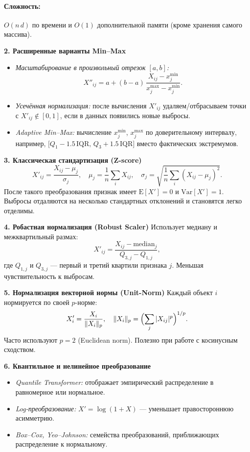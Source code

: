\paragraph{Сложность:} \(O(n\,d)\) по времени и \(O(1)\) дополнительной памяти (кроме хранения самого массива).

\medskip
\noindent\textbf{2. Расширенные варианты Min–Max}  
\begin{itemize}
  \item \emph{Масштабирование в произвольный отрезок \([a,b]\):}
    \[
      X''_{ij} = a + (b - a)\,\frac{X_{ij} - x_j^{\min}}{x_j^{\max} - x_j^{\min}}.
    \]
  \item \emph{Усечённая нормализация:} после вычисления \(X'_{ij}\) удаляем/отбрасываем точки с \(X'_{ij}\notin[0,1]\), если в данных появились новые выбросы.
  \item \emph{Adaptive Min–Max:} вычисление \(x_j^{\min}\), \(x_j^{\max}\) по доверительному интервалу, например, \(\bigl[Q_1 - 1.5\,\mathrm{IQR},\,Q_3 + 1.5\,\mathrm{IQR}\bigr]\) вместо фактических экстремумов.
\end{itemize}

\medskip
\noindent\textbf{3. Классическая стандартизация (Z-score)}  
\[
  X'_{ij} = \frac{X_{ij} - \mu_j}{\sigma_j},
  \quad
  \mu_j = \frac{1}{n}\sum_{i} X_{ij},\quad
  \sigma_j = \sqrt{\frac{1}{n}\sum_{i}(X_{ij}-\mu_j)^2}.
\]
После такого преобразования признак имеет \(\mathrm{E}[X'] = 0\) и \(\mathrm{Var}[X'] = 1\). Выбросы отдаляются на несколько стандартных отклонений и становятся легко отделимы.

\medskip
\noindent\textbf{4. Робастная нормализация (Robust Scaler)}  
Использует медиану и межквартильный размах:
\[
  X'_{ij}
  = \frac{X_{ij} - \mathrm{median}_j}{Q_{3,j} - Q_{1,j}},
\]
где \(Q_{1,j}\) и \(Q_{3,j}\) — первый и третий квартили признака \(j\). Меньшая чувствительность к выбросам.

\medskip
\noindent\textbf{5. Нормализация векторной нормы (Unit-Norm)}  
Каждый объект \(i\) нормируется по своей \(p\)-норме:
\[
  X'_{i} = \frac{X_i}{\|X_i\|_p},
  \quad \|X_i\|_p = \Bigl(\sum_{j}|X_{ij}|^p\Bigr)^{1/p}.
\]
Часто используют \(p=2\) (Euclidean norm). Полезно при работе с косинусным сходством.

\medskip
\noindent\textbf{6. Квантильное и нелинейное преобразование}  
\begin{itemize}
  \item \emph{Quantile Transformer:} отображает эмпирический распределение в равномерное или нормальное.
  \item \emph{Log-преобразование:} \(X' = \log(1 + X)\) — уменьшает правостороннюю асимметрию.
  \item \emph{Box–Cox, Yeo–Johnson:} семейства преобразований, приближающих распределение к нормальному.
\end{itemize}


